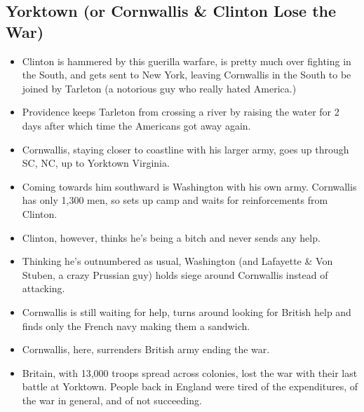 \documentclass{article}
\begin{document}
  \subsection{Yorktown (or Cornwallis \& Clinton Lose the War)}
    \begin{itemize}
      \item Clinton is hammered by this guerilla warfare, is pretty much over fighting in the South, and gets sent to New York, leaving Cornwallis in the South to be joined by Tarleton (a notorious guy who really hated America.)
      \item Providence keeps Tarleton from crossing a river by raising the water for 2 days after which time the Americans got away again. 
      \item Cornwallis, staying closer to coastline with his larger army, goes up through SC, NC, up to Yorktown Virginia.
      \item Coming towards him southward is Washington with his own army. Cornwallis has only 1,300 men, so sets up camp and waits for reinforcements from Clinton.
      \item Clinton, however, thinks he's being a bitch and never sends any help.
      \item Thinking he's outnumbered as usual, Washington (and Lafayette \& Von Stuben, a crazy Prussian guy) holds siege around Cornwallis instead of attacking.
      \item Cornwallis is still waiting for help, turns around looking for British help and finds only the French navy making them a sandwich.
      \item Cornwallis, here, surrenders British army ending the war.
      \item Britain, with 13,000 troops spread across colonies, lost the war with their last battle at Yorktown. People back in England were tired of the expenditures, of the war in general, and of not succeeding.
    \end{itemize}
\end{document}
